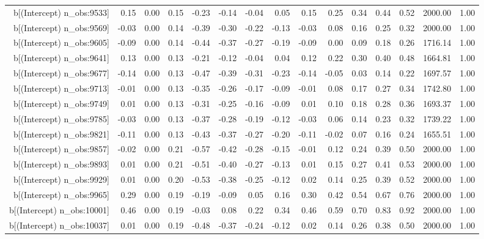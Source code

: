 \begin{table}[ht]
\begin{tabular}{rrrrrrrrrrrrrrr}
  b[(Intercept) n\_obs:9533] & 0.15 & 0.00 & 0.15 & -0.23 & -0.14 & -0.04 & 0.05 & 0.15 & 0.25 & 0.34 & 0.44 & 0.52 & 2000.00 & 1.00 \\ 
  b[(Intercept) n\_obs:9569] & -0.03 & 0.00 & 0.14 & -0.39 & -0.30 & -0.22 & -0.13 & -0.03 & 0.08 & 0.16 & 0.25 & 0.32 & 2000.00 & 1.00 \\ 
  b[(Intercept) n\_obs:9605] & -0.09 & 0.00 & 0.14 & -0.44 & -0.37 & -0.27 & -0.19 & -0.09 & 0.00 & 0.09 & 0.18 & 0.26 & 1716.14 & 1.00 \\ 
  b[(Intercept) n\_obs:9641] & 0.13 & 0.00 & 0.13 & -0.21 & -0.12 & -0.04 & 0.04 & 0.12 & 0.22 & 0.30 & 0.40 & 0.48 & 1664.81 & 1.00 \\ 
  b[(Intercept) n\_obs:9677] & -0.14 & 0.00 & 0.13 & -0.47 & -0.39 & -0.31 & -0.23 & -0.14 & -0.05 & 0.03 & 0.14 & 0.22 & 1697.57 & 1.00 \\ 
  b[(Intercept) n\_obs:9713] & -0.01 & 0.00 & 0.13 & -0.35 & -0.26 & -0.17 & -0.09 & -0.01 & 0.08 & 0.17 & 0.27 & 0.34 & 1742.80 & 1.00 \\ 
  b[(Intercept) n\_obs:9749] & 0.01 & 0.00 & 0.13 & -0.31 & -0.25 & -0.16 & -0.09 & 0.01 & 0.10 & 0.18 & 0.28 & 0.36 & 1693.37 & 1.00 \\ 
  b[(Intercept) n\_obs:9785] & -0.03 & 0.00 & 0.13 & -0.37 & -0.28 & -0.19 & -0.12 & -0.03 & 0.06 & 0.14 & 0.23 & 0.32 & 1739.22 & 1.00 \\ 
  b[(Intercept) n\_obs:9821] & -0.11 & 0.00 & 0.13 & -0.43 & -0.37 & -0.27 & -0.20 & -0.11 & -0.02 & 0.07 & 0.16 & 0.24 & 1655.51 & 1.00 \\ 
  b[(Intercept) n\_obs:9857] & -0.02 & 0.00 & 0.21 & -0.57 & -0.42 & -0.28 & -0.15 & -0.01 & 0.12 & 0.24 & 0.39 & 0.50 & 2000.00 & 1.00 \\ 
  b[(Intercept) n\_obs:9893] & 0.01 & 0.00 & 0.21 & -0.51 & -0.40 & -0.27 & -0.13 & 0.01 & 0.15 & 0.27 & 0.41 & 0.53 & 2000.00 & 1.00 \\ 
  b[(Intercept) n\_obs:9929] & 0.01 & 0.00 & 0.20 & -0.53 & -0.38 & -0.25 & -0.12 & 0.02 & 0.14 & 0.25 & 0.39 & 0.52 & 2000.00 & 1.00 \\ 
  b[(Intercept) n\_obs:9965] & 0.29 & 0.00 & 0.19 & -0.19 & -0.09 & 0.05 & 0.16 & 0.30 & 0.42 & 0.54 & 0.67 & 0.76 & 2000.00 & 1.00 \\ 
  b[(Intercept) n\_obs:10001] & 0.46 & 0.00 & 0.19 & -0.03 & 0.08 & 0.22 & 0.34 & 0.46 & 0.59 & 0.70 & 0.83 & 0.92 & 2000.00 & 1.00 \\ 
  b[(Intercept) n\_obs:10037] & 0.01 & 0.00 & 0.19 & -0.48 & -0.37 & -0.24 & -0.12 & 0.02 & 0.14 & 0.26 & 0.38 & 0.50 & 2000.00 & 1.00 \\ 

\end{tabular}
\end{table}

